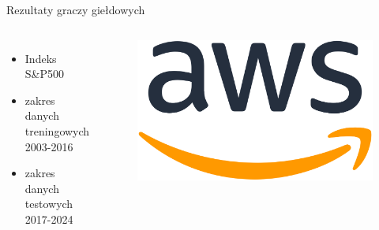 \begin{frame}{Rezultaty graczy giełdowych}
    \begin{columns}[t]
            \begin{itemize}
                \item Indeks S\&P500
                \item zakres danych treningowych 2003-2016
                \item zakres danych testowych 2017-2024
            \end{itemize}
        \centering
        \begin{figure}
            \centering
            \includegraphics[width=1\textwidth]{images/aws_logo.png}
        \end{figure}    
    \end{columns}
\end{frame}

